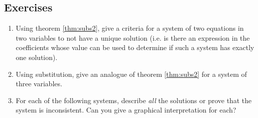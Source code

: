 \documentclass[a4paper,leqno]{article}
\numberwithin{equation}{section}
\theoremstyle{definition}
\theoremstyle{remark}
\begin{document}
\subsection*{Exercises}
\begin{enumerate}
  \item Using theorem \ref{thm:subs2}, give a criteria for a system of two equations in two variables to not have a unique solution (i.e. is there
        an expression in the coefficients whose value can be used to determine if such a system has exactly one solution).
  \item Using substitution, give an analogue of theorem \ref{thm:subs2} for a system of three variables.
  \item For each of the following systems, describe \emph{all} the solutions or prove that the system is inconsistent. Can
        you give a graphical interpretation for each?
    \begin{adjustwidth*}{-0.5in}{-0.5in}
      \begin{center}
        \hspace*{\fill}
\end{center}
\end{adjustwidth*}
\end{enumerate}
\end{document}
